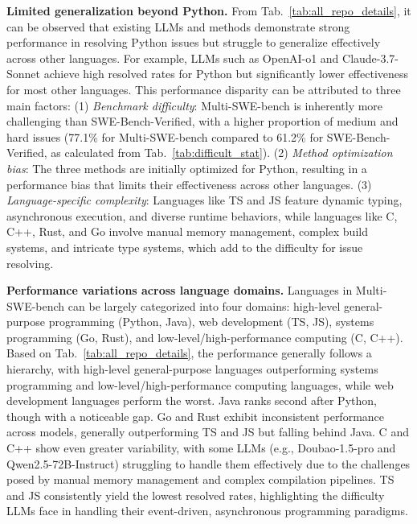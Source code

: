 \documentclass[11pt, a4paper, logo, copyright, nonumbering]{seed}
\newcommand{\multiswebench}{Multi-SWE-bench\xspace}
\begin{document}
\textbf{Limited generalization beyond Python.}
From Tab.~\ref{tab:all_repo_details}, it can be observed that existing LLMs and methods demonstrate strong performance in resolving Python issues but struggle to generalize effectively across other languages.
For example, LLMs such as OpenAI-o1 and Claude-3.7-Sonnet achieve high resolved rates for Python but significantly lower effectiveness for most other languages.
This performance disparity can be attributed to three main factors:
(1) \emph{Benchmark difficulty}: \multiswebench is inherently more challenging than SWE-Bench-Verified, with a higher proportion of medium and hard issues (77.1\% for \multiswebench compared to 61.2\% for SWE-Bench-Verified, as calculated from Tab.~\ref{tab:difficult_stat}).
(2) \emph{Method optimization bias}: The three methods are initially optimized for Python, resulting in a performance bias that limits their effectiveness across other languages.
(3) \emph{Language-specific complexity}: Languages like TS and JS feature dynamic typing, asynchronous execution, and diverse runtime behaviors, while languages like C, C++, Rust, and Go involve manual memory management, complex build systems, and intricate type systems, which add to the difficulty for issue resolving.

\textbf{Performance variations across language domains.}
Languages in \multiswebench can be largely categorized into four domains: high-level general-purpose programming (Python, Java), web development (TS, JS), systems programming (Go, Rust), and low-level/high-performance computing (C, C++).
Based on Tab.~\ref{tab:all_repo_details}, the performance generally follows a hierarchy, with high-level general-purpose languages outperforming systems programming and low-level/high-performance computing languages, while web development languages perform the worst.
Java ranks second after Python, though with a noticeable gap.
Go and Rust exhibit inconsistent performance across models, generally outperforming TS and JS but falling behind Java.
C and C++ show even greater variability, with some LLMs (e.g., Doubao-1.5-pro and Qwen2.5-72B-Instruct) struggling to handle them effectively due to the challenges posed by manual memory management and complex compilation pipelines.
TS and JS consistently yield the lowest resolved rates, highlighting the difficulty LLMs face in handling their event-driven, asynchronous programming paradigms.
\end{document}
